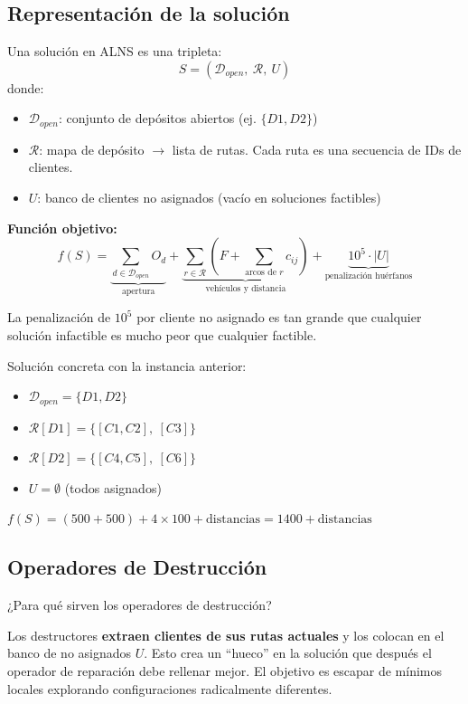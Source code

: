\documentclass[12pt,a4paper]{article}
\begin{document}
\subsection{Representación de la solución}

Una solución en ALNS es una tripleta:
$$S = (\mathcal{D}_{open},\ \mathcal{R},\ U)$$
donde:
\begin{itemize}
\item $\mathcal{D}_{open}$: conjunto de depósitos abiertos (ej. $\{D1, D2\}$)
\item $\mathcal{R}$: mapa de depósito $\to$ lista de rutas. Cada ruta es una secuencia de IDs de clientes.
\item $U$: banco de clientes no asignados (vacío en soluciones factibles)
\end{itemize}

\textbf{Función objetivo:}
$$f(S) = \underbrace{\sum_{d \in \mathcal{D}_{open}} O_d}_{\text{apertura}} + \underbrace{\sum_{r \in \mathcal{R}} \left(F + \sum_{\text{arcos de }r} c_{ij}\right)}_{\text{vehículos y distancia}} + \underbrace{10^5 \cdot |U|}_{\text{penalización huérfanos}}$$

La penalización de $10^5$ por cliente no asignado es tan grande que cualquier solución infactible es mucho peor que cualquier factible.

\begin{ejemplo}
Solución concreta con la instancia anterior:
\begin{itemize}
\item $\mathcal{D}_{open} = \{D1, D2\}$
\item $\mathcal{R}[D1] = \{[C1, C2],\ [C3]\}$
\item $\mathcal{R}[D2] = \{[C4, C5],\ [C6]\}$
\item $U = \emptyset$ (todos asignados)
\end{itemize}
$f(S) = (500+500) + 4\times100 + \text{distancias} = 1400 + \text{distancias}$
\end{ejemplo}

\subsection{Operadores de Destrucción}

\begin{pregunta}
¿Para qué sirven los operadores de destrucción?
\end{pregunta}

Los destructores \textbf{extraen clientes de sus rutas actuales} y los colocan en el banco de no asignados $U$. Esto crea un ``hueco'' en la solución que después el operador de reparación debe rellenar mejor. El objetivo es escapar de mínimos locales explorando configuraciones radicalmente diferentes.
\end{document}
